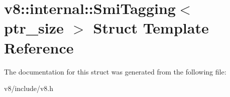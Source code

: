 \hypertarget{structv8_1_1internal_1_1SmiTagging}{}\section{v8\+:\+:internal\+:\+:Smi\+Tagging$<$ ptr\+\_\+size $>$ Struct Template Reference}
\label{structv8_1_1internal_1_1SmiTagging}


The documentation for this struct was generated from the following file\+:\begin{DoxyCompactItemize}
\item 
v8/include/v8.\+h\end{DoxyCompactItemize}
